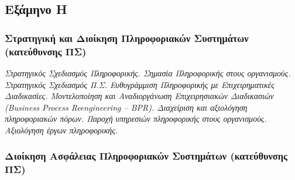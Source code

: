 \hypertarget{ux3b5ux3beux3acux3bcux3b7ux3bdux3bf-ux3b7}{%
\subsection{Εξάμηνο Η}\label{ux3b5ux3beux3acux3bcux3b7ux3bdux3bf-ux3b7}}

\hypertarget{ux3c3ux3c4ux3c1ux3b1ux3c4ux3b7ux3b3ux3b9ux3baux3ae-ux3baux3b1ux3b9-ux3b4ux3b9ux3bfux3afux3baux3b7ux3c3ux3b7-ux3c0ux3bbux3b7ux3c1ux3bfux3c6ux3bfux3c1ux3b9ux3b1ux3baux3ceux3bd-ux3c3ux3c5ux3c3ux3c4ux3b7ux3bcux3acux3c4ux3c9ux3bd-ux3baux3b1ux3c4ux3b5ux3cdux3b8ux3c5ux3bdux3c3ux3b7ux3c2-ux3c0ux3c3}{%
\subsubsection{Στρατηγική και Διοίκηση Πληροφοριακών Συστημάτων
(κατεύθυνσης
ΠΣ)}\label{ux3c3ux3c4ux3c1ux3b1ux3c4ux3b7ux3b3ux3b9ux3baux3ae-ux3baux3b1ux3b9-ux3b4ux3b9ux3bfux3afux3baux3b7ux3c3ux3b7-ux3c0ux3bbux3b7ux3c1ux3bfux3c6ux3bfux3c1ux3b9ux3b1ux3baux3ceux3bd-ux3c3ux3c5ux3c3ux3c4ux3b7ux3bcux3acux3c4ux3c9ux3bd-ux3baux3b1ux3c4ux3b5ux3cdux3b8ux3c5ux3bdux3c3ux3b7ux3c2-ux3c0ux3c3}}

\emph{Στρατηγικός Σχεδιασμός Πληροφορικής. Σημασία Πληροφορικής στους
οργανισμούς. Στρατηγικός Σχεδιασμός Π.Σ. Ευθυγράμμιση Πληροφορικής με
Επιχειρηματικές Διαδικασίες. Μοντελοποίηση και Αναδιοργάνωση
Επιχειρησιακών Διαδικασιών (Business Process Reengineering -- BPR).
Διαχείριση και αξιολόγηση πληροφοριακών πόρων. Παροχή υπηρεσιών
πληροφορικής στους οργανισμούς. Αξιολόγηση έργων πληροφορικής.}

\hypertarget{ux3b4ux3b9ux3bfux3afux3baux3b7ux3c3ux3b7-ux3b1ux3c3ux3c6ux3acux3bbux3b5ux3b9ux3b1ux3c2-ux3c0ux3bbux3b7ux3c1ux3bfux3c6ux3bfux3c1ux3b9ux3b1ux3baux3ceux3bd-ux3c3ux3c5ux3c3ux3c4ux3b7ux3bcux3acux3c4ux3c9ux3bd-ux3baux3b1ux3c4ux3b5ux3cdux3b8ux3c5ux3bdux3c3ux3b7ux3c2-ux3c0ux3c3}{%
\subsubsection{Διοίκηση Ασφάλειας Πληροφοριακών Συστημάτων (κατεύθυνσης
ΠΣ)}\label{ux3b4ux3b9ux3bfux3afux3baux3b7ux3c3ux3b7-ux3b1ux3c3ux3c6ux3acux3bbux3b5ux3b9ux3b1ux3c2-ux3c0ux3bbux3b7ux3c1ux3bfux3c6ux3bfux3c1ux3b9ux3b1ux3baux3ceux3bd-ux3c3ux3c5ux3c3ux3c4ux3b7ux3bcux3acux3c4ux3c9ux3bd-ux3baux3b1ux3c4ux3b5ux3cdux3b8ux3c5ux3bdux3c3ux3b7ux3c2-ux3c0ux3c3}}

